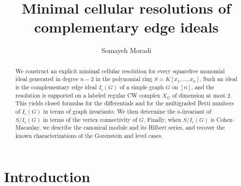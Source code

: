 \documentclass[12pt]{amsart}
\begin{document}
	
	\title{Minimal cellular resolutions of complementary edge ideals}
	\author{Somayeh Moradi}
	
	
	\address{Somayeh Moradi, Department of Mathematics, Faculty of Science, Ilam University, P.O.Box 69315-516, Ilam, Iran}
	
	
\begin{abstract}
We construct an explicit minimal cellular  resolution for every squarefree monomial ideal generated in degree $n-2$ in the polynomial ring $S=K[x_1,\ldots,x_n]$. Such an ideal is the complementary edge ideal $I_c(G)$ of a simple graph $G$ on $[n]$, and the resolution is supported on a labeled regular CW complex $X_G$ of dimension at most $2$. This yields closed formulas for the differentials and for the multigraded Betti numbers of $I_c(G)$ in terms of graph invariants. We then determine the $a$-invariant of $S/I_c(G)$ in terms of the vertex connectivity of $G$. Finally, when $S/I_c(G)$ is Cohen--Macaulay, we describe the canonical module and its Hilbert series, and recover the known characterizations of the Gorenstein and level cases. 
\end{abstract}
	
	\maketitle\vspace*{-1.4em}
	\section*{Introduction}
\end{document}
